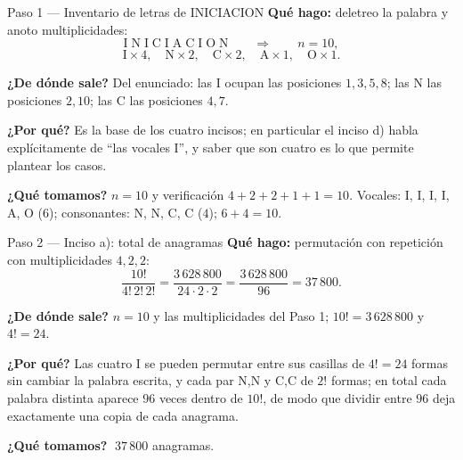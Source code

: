 \documentclass[11pt]{article}
\begin{document}
\begin{paso}{Paso 1 --- Inventario de letras de INICIACION}
\textbf{Qué hago:} deletreo la palabra y anoto multiplicidades:
\[
\text{I}\;\text{N}\;\text{I}\;\text{C}\;\text{I}\;\text{A}\;\text{C}\;\text{I}\;\text{O}\;\text{N}
\qquad\Longrightarrow\qquad n=10,
\]
\[
\text{I}\times4,\quad \text{N}\times2,\quad \text{C}\times2,\quad \text{A}\times1,\quad \text{O}\times1 .
\]

\textbf{¿De dónde sale?} Del enunciado: las I ocupan las posiciones $1,3,5,8$; las N las posiciones
$2,10$; las C las posiciones $4,7$.

\textbf{¿Por qué?} Es la base de los cuatro incisos; en particular el inciso d) habla explícitamente de
``las vocales I'', y saber que son cuatro es lo que permite plantear los casos.

\textbf{¿Qué tomamos?} $n=10$ y verificación $4+2+2+1+1=10$. Vocales: I, I, I, I, A, O ($6$);
consonantes: N, N, C, C ($4$); $6+4=10$.
\end{paso}

\begin{paso}{Paso 2 --- Inciso a): total de anagramas}
\textbf{Qué hago:} permutación con repetición con multiplicidades $4,2,2$:
\[
\frac{10!}{4!\,2!\,2!}=\frac{3\,628\,800}{24\cdot2\cdot2}=\frac{3\,628\,800}{96}=37\,800 .
\]

\textbf{¿De dónde sale?} $n=10$ y las multiplicidades del Paso 1; $10!=3\,628\,800$ y $4!=24$.

\textbf{¿Por qué?} Las cuatro I se pueden permutar entre sus casillas de $4!=24$ formas sin cambiar la
palabra escrita, y cada par N,N y C,C de $2!$ formas; en total cada palabra distinta aparece $96$ veces
dentro de $10!$, de modo que dividir entre $96$ deja exactamente una copia de cada anagrama.

\textbf{¿Qué tomamos?} $\;37\,800$ anagramas.
\end{paso}
\end{document}
